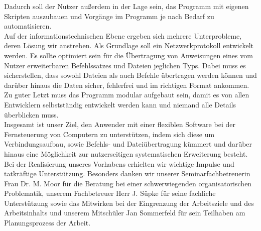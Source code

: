 Dadurch soll der Nutzer außerdem in der Lage sein, das Programm mit eigenen Skripten auszubauen und Vorgänge im Programm je nach Bedarf zu automatisieren.\\
Auf der informationstechnischen Ebene ergeben sich mehrere Unterprobleme, deren Lösung wir anstreben. Als Grundlage soll ein Netzwerkprotokoll entwickelt werden.
Es sollte optimiert sein für die Übertragung von Anweisungen eines vom Nutzer erweiterbaren Befehlssatzes und Dateien jeglichen Typs. Dabei muss es sicherstellen, dass sowohl Dateien als auch Befehle übertragen werden können und darüber hinaus die Daten sicher, fehlerfrei und im richtigen Format ankommen.\\
Zu guter Letzt muss das Programm modular aufgebaut sein, damit es von allen Entwicklern selbstständig entwickelt werden kann und niemand alle Details überblicken muss.\\
Insgesamt ist unser Ziel, den Anwender mit einer flexiblen Software bei der Fernsteuerung von Computern zu unterstützen, indem sich diese um Verbindungsaufbau, sowie Befehls- und Dateiübertragung kümmert und darüber hinaus eine Möglichkeit zur nutzerseitigen systematischen Erweiterung besteht.\\

Bei der Realisierung unseres Vorhabens erhielten wir wichtige Impulse und tatkräftige Unterstützung. Besonders danken wir unserer Seminarfachbetreuerin Frau Dr. M. Moor für die Beratung bei einer schwerwiegenden organisatorischen Problematik, unserem Fachbetreuer Herr J. Süpke für seine fachliche Unterstützung sowie das Mitwirken bei der Eingrenzung der Arbeitsziele und des Arbeitsinhalts und unserem Mitschüler Jan Sommerfeld für sein Teilhaben am Planungsprozess der Arbeit.  
%